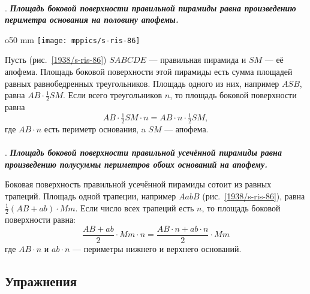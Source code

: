 \paragraph{}\label{1938/s80}
.
\textbf{\emph{Площадь боковой поверхности правильной пирамиды равна произведению периметра основания на половину апофемы.}}

\begin{wrapfigure}{o}{50 mm}
\vskip-0mm
\centering
\texttt{[image: mppics/s-ris-86]}
\caption{}\label{1938/s-ris-86}
\vskip-0mm
\end{wrapfigure}

Пусть (рис.~\ref{1938/s-ris-86}) $SABCDE$ — правильная пирамида и $SM$ — её апофема.
Площадь боковой поверхности этой пирамиды есть сумма площадей равных равнобедренных треугольников.
Площадь одного из них, например $ASB$, равна $AB\cdot\tfrac12SM$.
Если всего треугольников $n$, то площадь боковой поверхности равна 
\[AB\cdot\tfrac12SM\cdot n= AB\cdot n\cdot\tfrac12SM,\]
где $AB\cdot n$ есть периметр основания, a $SM$ — апофема.

\paragraph{}\label{1938/s81}
\mbox{.}
\textbf{\emph{Площадь боковой поверхности правильной усечённой пирамиды равна произведению полусуммы периметров обоих оснований на апофему.}}

Боковая поверхность правильной усечённой пирамиды сотоит из равных трапеций.
Площадь одной трапеции, например $AabB$ (рис.~\ref{1938/s-ris-86}), равна $\tfrac12(AB + ab)\cdot Mm$.
Если число всех трапеций есть $n$, то площадь боковой поверхности равна:
\[\frac{AB+ab}{2}\cdot Mm\cdot n=\frac{AB\cdot n+ab\cdot n}{2}\cdot Mm\]
где $AB\cdot n$ и $ab\cdot n$ — периметры нижнего и верхнего оснований.

\subsection*{Упражнения}



